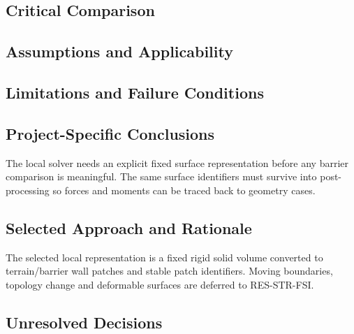 
\subsection{Critical Comparison}
\label{sec:res-geo-rep-critical-comparison}


\subsection{Assumptions and Applicability}
\label{sec:res-geo-rep-assumptions}


\subsection{Limitations and Failure Conditions}
\label{sec:res-geo-rep-limitations}


\subsection{Project-Specific Conclusions}
\label{sec:res-geo-rep-conclusions}

The local solver needs an explicit fixed surface representation before
any barrier comparison is meaningful. The same surface identifiers
must survive into post-processing so forces and moments can be traced
back to geometry cases.

\subsection{Selected Approach and Rationale}
\label{sec:res-geo-rep-selected-approach}

The selected local representation is a fixed rigid solid volume
converted to terrain/barrier wall patches and stable patch identifiers.
Moving boundaries, topology change and deformable surfaces are
deferred to RES-STR-FSI.

\subsection{Unresolved Decisions}
\label{sec:res-geo-rep-unresolved-decisions}

